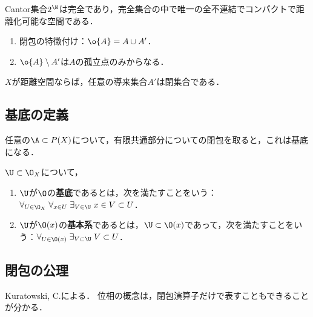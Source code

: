 \documentclass[uplatex,dvipdfmx]{jsreport}
\begin{document}
\begin{example}
    Cantor集合$2^\N$は完全であり，完全集合の中で唯一の全不連結でコンパクトで距離化可能な空間である．
\end{example}

\begin{proposition}[導来作用素の性質]\mbox{}
    \begin{enumerate}
        \item 閉包の特徴付け：$\o{A}=A\cup A'$．
        \item $\o{A}\setminus A'$は$A$の孤立点のみからなる．
    \end{enumerate}
\end{proposition}

\begin{proposition}
    $X$が距離空間ならば，任意の導来集合$A'$は閉集合である．
\end{proposition}

\subsection{基底の定義}

\begin{tcolorbox}[colframe=ForestGreen, colback=ForestGreen!10!white,breakable,colbacktitle=ForestGreen!40!white,coltitle=black,fonttitle=\bfseries\sffamily,
title=]
    任意の$\A\subset P(X)$について，有限共通部分についての閉包を取ると，これは基底になる．
\end{tcolorbox}

\begin{definition}
    $\U\subset\O_X$について，
    \begin{enumerate}
        \item $\U$が$\O$の\textbf{基底}であるとは，次を満たすことをいう：$\forall_{U\in\O_X}\;\forall_{x\in U}\;\exists_{V\in\U}\;x\in V\subset U$．
        \item $\U$が$\O(x)$の\textbf{基本系}であるとは，$\U\subset\O(x)$であって，次を満たすことをいう：$\forall_{U\in\O(x)}\;\exists_{V\subset\U}\;V\subset U$．
    \end{enumerate}
\end{definition}

\subsection{閉包の公理}

\begin{tcolorbox}[colframe=ForestGreen, colback=ForestGreen!10!white,breakable,colbacktitle=ForestGreen!40!white,coltitle=black,fonttitle=\bfseries\sffamily,
title=]
    Kuratowski, C.による．
    位相の概念は，閉包演算子だけで表すこともできることが分かる．
\end{tcolorbox}
\end{document}
